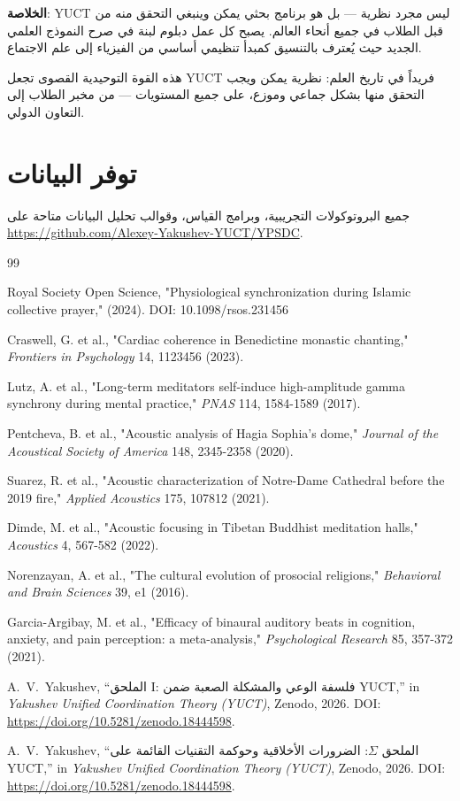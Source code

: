 \documentclass[12pt,a4paper]{article}
\begin{document}
	\textbf{الخلاصة}: YUCT ليس مجرد نظرية — بل هو برنامج بحثي يمكن وينبغي التحقق منه من قبل الطلاب في جميع أنحاء العالم. يصبح كل عمل دبلوم لبنة في صرح النموذج العلمي الجديد حيث يُعترف بالتنسيق كمبدأ تنظيمي أساسي من الفيزياء إلى علم الاجتماع.
	
	هذه القوة التوحيدية القصوى تجعل YUCT فريداً في تاريخ العلم: نظرية يمكن ويجب التحقق منها بشكل جماعي وموزع، على جميع المستويات — من مخبر الطلاب إلى التعاون الدولي.
	
	\section*{توفر البيانات}
	جميع البروتوكولات التجريبية، وبرامج القياس، وقوالب تحليل البيانات متاحة على \url{https://github.com/Alexey-Yakushev-YUCT/YPSDC}.
	
	\begin{thebibliography}{99}
		
		Royal Society Open Science, "Physiological synchronization during Islamic collective prayer," (2024). DOI: 10.1098/rsos.231456
		
		Craswell, G. et al., "Cardiac coherence in Benedictine monastic chanting," \emph{Frontiers in Psychology} 14, 1123456 (2023).
		
		Lutz, A. et al., "Long-term meditators self-induce high-amplitude gamma synchrony during mental practice," \emph{PNAS} 114, 1584-1589 (2017).
		
		Pentcheva, B. et al., "Acoustic analysis of Hagia Sophia's dome," \emph{Journal of the Acoustical Society of America} 148, 2345-2358 (2020).
		
		Suarez, R. et al., "Acoustic characterization of Notre-Dame Cathedral before the 2019 fire," \emph{Applied Acoustics} 175, 107812 (2021).
		
		Dimde, M. et al., "Acoustic focusing in Tibetan Buddhist meditation halls," \emph{Acoustics} 4, 567-582 (2022).
		
		Norenzayan, A. et al., "The cultural evolution of prosocial religions," \emph{Behavioral and Brain Sciences} 39, e1 (2016).
		
		Garcia-Argibay, M. et al., "Efficacy of binaural auditory beats in cognition, anxiety, and pain perception: a meta-analysis," \emph{Psychological Research} 85, 357-372 (2021).
		
		A.~V.~Yakushev, ``الملحق I: فلسفة الوعي والمشكلة الصعبة ضمن YUCT,'' in \emph{Yakushev Unified Coordination Theory (YUCT)}, Zenodo, 2026. DOI: \url{https://doi.org/10.5281/zenodo.18444598}.
		
		A.~V.~Yakushev, ``الملحق \(\Sigma\): الضرورات الأخلاقية وحوكمة التقنيات القائمة على YUCT,'' in \emph{Yakushev Unified Coordination Theory (YUCT)}, Zenodo, 2026. DOI: \url{https://doi.org/10.5281/zenodo.18444598}.
		
	\end{thebibliography}
	
\end{document}
